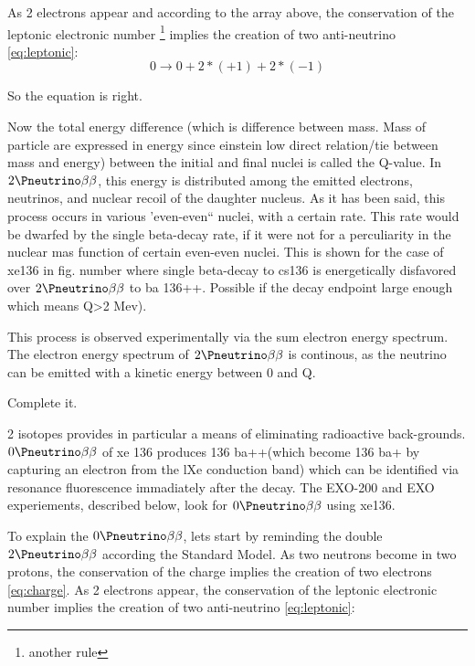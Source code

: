\documentclass[a4paper, 11pt]{report}%
\begin{document}
 As 2 electrons appear and according to the array above, the conservation of the leptonic electronic number \footnote{another rule} 
 implies the creation of two anti-neutrino \ref{eq:leptonic}:  
 \begin{equation} \label{eq:leptonic}
    0 \rightarrow 0 + 2*(+1) + 2*(-1)
 \end{equation}
  
 So the equation is right. 
 
 Now the total energy difference (which is difference between mass. Mass of particle are expressed in energy since einstein low
 direct relation/tie between mass and energy) between the initial and final nuclei
 is called the Q-value. In \(2\Pneutrino\beta\beta\), this energy is distributed among the emitted electrons, neutrinos, and nuclear 
 recoil of the daughter nucleus. As it has been said, this process occurs in various
 'even-even`` nuclei, with a certain rate. This rate would be dwarfed by the single 
 beta-decay rate, if it were not for a perculiarity in the nuclear mas function of certain
 even-even nuclei. This is shown for the case of xe136 in fig. number where single beta-decay to cs136 is energetically disfavored
 over \(2\Pneutrino\beta\beta\) to ba 136++. Possible  if the decay endpoint large enough which means Q>2 Mev). 
 
 This process is observed experimentally via the sum electron energy spectrum. 
 The electron energy spectrum of \(2\Pneutrino\beta\beta\) is continous, as the neutrino can be emitted with a kinetic
 energy between 0 and Q. 
 
 Complete it. 
 
 2 isotopes provides in particular a means of eliminating radioactive back-grounds. 
 \(0\Pneutrino\beta\beta\) of xe 136 produces 136 ba++(which become 136 ba+ by capturing an electron from the lXe conduction
 band) which can be identified via resonance fluorescence immadiately after the decay. The 
 EXO-200 and EXO experiements, described below, look for  \(0\Pneutrino\beta\beta\) using xe136. 
  
  To explain the \(0\Pneutrino\beta\beta\), lets start by reminding the double \(2\Pneutrino\beta\beta\) according the Standard Model. 
  As two neutrons become in two protons, the conservation of the charge implies the creation of two electrons \ref{eq:charge}. As 2 electrons appear, 
  the conservation of the leptonic electronic number implies the creation of two anti-neutrino \ref{eq:leptonic}:  
  
\end{document}
